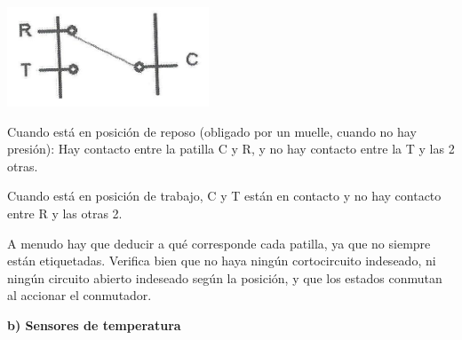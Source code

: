 \documentclass[a5paper,twoside,openany]{book}
\begin{document}
\noindent\begin{minipage}[t]{0.35\textwidth}\vspace{0pt}
\includegraphics[width=\linewidth]{conmutador}
\end{minipage}
\hfill%
\begin{minipage}[t]{0.6\textwidth}\vspace{\fill}
\vspace{\fill} %
Cuando está en posición de reposo (obligado por un muelle, cuando no hay presión): Hay contacto entre la patilla C y R, y no hay contacto entre la T y las 2 otras.\\
\vspace{\fill} %
\end{minipage}
\vspace{1em}

Cuando está en posición de trabajo, C y T están en contacto y no hay contacto entre R y las otras 2.

A menudo hay que deducir a qué corresponde cada patilla, ya que no siempre están etiquetadas. Verifica bien que no haya ningún cortocircuito indeseado, ni ningún circuito abierto indeseado según la posición, y que los estados conmutan al accionar el conmutador.

\begin{center}
\textbf{b) Sensores de temperatura}
\end{center}
\end{document}
